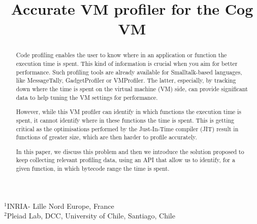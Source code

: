 \documentclass[10pt,preprint]{sigplanconf}
\newcommand{\Title}{Accurate VM profiler for the Cog VM}
\newcommand{\Authors}{Sophie Kaleba, Cl\'ement B\'era, Alexandre Bergel$^3$\\[2 ex]
$^3$Pleiad Lab, DCC, University of Chile}
\begin{document}
\setlength{\pdfpageheight}{\paperheight}
\setlength{\pdfpagewidth}{\paperwidth}



\title{\Title}


           {$^1$INRIA- Lille Nord Europe, France\\
             $^2$Pleiad Lab, DCC, University of Chile, Santiago, Chile}
           {}


\maketitle

\begin{abstract}

Code profiling enables the user to know where in an application or function the execution time is spent. This kind of information is crucial when you aim for better performance. 
Such profiling tools are already available for Smalltalk-based languages, like MessageTally, GadgetProfiler or VMProfiler. The latter, especially, by tracking down where the time is spent on the virtual machine (VM) side, can provide significant data to help tuning the VM settings for performance.

However, while this VM profiler can identify in which functions the execution time is spent, it cannot identify where in these functions the time is spent. This is getting critical as the optimisations performed by the Just-In-Time compiler (JIT) result in functions of greater size, which are then harder to profile accurately.

In this paper, we discuss this problem and then we introduce the solution proposed to keep collecting relevant profiling data, using an API that allow us to identify, for a given function, in which bytecode range the time is spent.

\end{abstract}


\end{document}
